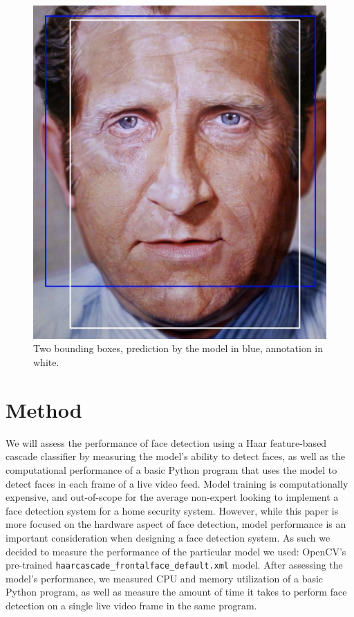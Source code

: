 \documentclass[conference]{IEEEtran}
\begin{document}
\begin{figure}[htbp]
\centerline{\includegraphics[scale=0.4]{IOU.png}}
\caption{Two bounding boxes, prediction by the model in blue, annotation in white. }
\label{example_iou}
\end{figure}
\vspace{-10pt}
\section{Method}
We will assess the performance of face detection using a Haar feature-based cascade classifier by measuring the model’s ability to detect faces, as well as the computational performance of a basic Python program that uses the model to detect faces in each frame of a live video feed. Model training is computationally expensive, and out-of-scope for the average non-expert looking to implement a face detection system for a home security system. However, while this paper is more focused on the hardware aspect of face detection, model performance is an important consideration when designing a face detection system. As such we decided to measure the performance of the particular model we used: OpenCV’s pre-trained \texttt{haarcascade\_frontalface\_default.xml} model. After assessing the model's performance, we measured CPU and memory utilization of a basic Python program, as well as measure the amount of time it takes to perform face detection on a single live video frame in the same program.
\end{document}
